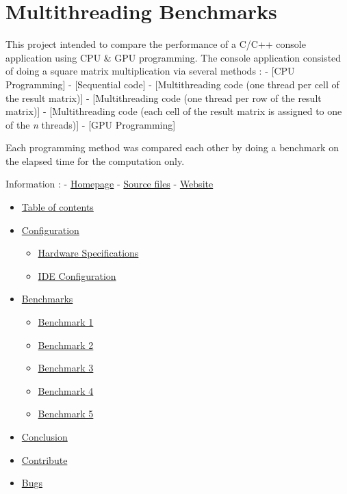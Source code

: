 \documentclass[]{article}
\author{}
\date{}
\begin{document}
\section{Multithreading Benchmarks}\label{multithreading-benchmarks}

This project intended to compare the performance of a C/C++ console
application using CPU \& GPU programming. The console application
consisted of doing a square matrix multiplication via several methods :
- {[}CPU Programming{]} - {[}Sequential code{]} - {[}Multithreading code
(one thread per cell of the result matrix){]} - {[}Multithreading code
(one thread per row of the result matrix){]} - {[}Multithreading code
(each cell of the result matrix is assigned to one of the \emph{n}
threads){]} - {[}GPU Programming{]}

Each programming method was compared each other by doing a benchmark on
the elapsed time for the computation only.

Information : - \href{https://github.com/CorkyMaigre}{Homepage} -
\href{https://github.com/CorkyMaigre/multithreading-benchmarks}{Source
files} - \href{http://www.corkymaigre.be/}{Website}


\begin{itemize}
\itemsep1pt\parskip0pt
\item
  \hyperref[table-of-contents]{Table of contents}
\item
  \hyperref[configuration]{Configuration}

  \begin{itemize}
  \itemsep1pt\parskip0pt
  \item
    \hyperref[hardware-specifications]{Hardware Specifications}
  \item
    \hyperref[ide-configuration]{IDE Configuration}
  \end{itemize}
\item
  \hyperref[benchmarks]{Benchmarks}

  \begin{itemize}
  \itemsep1pt\parskip0pt
  \item
    \hyperref[benchmark-1]{Benchmark 1}
  \item
    \hyperref[benchmark-2]{Benchmark 2}
  \item
    \hyperref[benchmark-3]{Benchmark 3}
  \item
    \hyperref[benchmark-4]{Benchmark 4}
  \item
    \hyperref[benchmark-5]{Benchmark 5}
  \end{itemize}
\item
  \hyperref[conclusion]{Conclusion}
\item
  \hyperref[contribute]{Contribute}
\item
  \hyperref[bugs]{Bugs}
\end{itemize}
\end{document}
